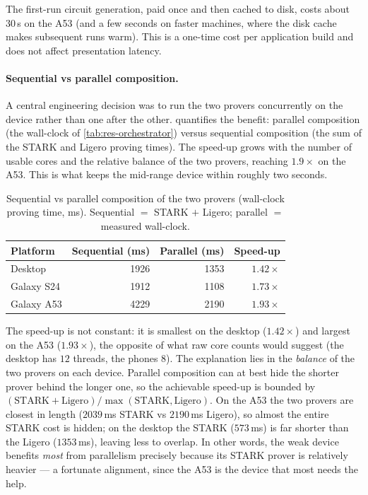 \documentclass{article}
\begin{document}
The first-run circuit generation, paid once and then cached to disk, costs about
$30$\,s on the A53 (and a few seconds on faster machines, where the disk cache
makes subsequent runs warm). This is a one-time cost per application build and
does not affect presentation latency.

\paragraph{Sequential vs parallel composition.}
A central engineering decision was to run the two provers concurrently on the
device rather than one after the other.  quantifies the
benefit: parallel composition (the wall-clock of \cref{tab:res-orchestrator})
versus sequential composition (the sum of the STARK and Ligero proving times).
The speed-up grows with the number of usable cores and the relative balance of
the two provers, reaching $1.9\times$ on the A53. This is what keeps the
mid-range device within roughly two seconds.

\begin{table}[ht]
  \centering
  \caption{Sequential vs parallel composition of the two provers (wall-clock
  proving time, ms). Sequential $=$ STARK $+$ Ligero; parallel $=$ measured
  wall-clock.}
  \label{tab:res-composition}
  \small
  \begin{tabular}{@{}lrrr@{}}
    \toprule
    \textbf{Platform} & \textbf{Sequential (ms)} & \textbf{Parallel (ms)} & \textbf{Speed-up} \\
    \midrule
    Desktop    & 1926 & 1353 & $1.42\times$ \\
    Galaxy S24 & 1912 & 1108 & $1.73\times$ \\
    Galaxy A53 & 4229 & 2190 & $1.93\times$ \\
    \bottomrule
  \end{tabular}
\end{table}

The speed-up is not constant: it is smallest on the desktop ($1.42\times$) and
largest on the A53 ($1.93\times$), the opposite of what raw core counts would
suggest (the desktop has $12$ threads, the phones $8$). The explanation lies in
the \emph{balance} of the two provers on each device. Parallel composition can at
best hide the shorter prover behind the longer one, so the achievable speed-up is
bounded by $(\text{STARK}+\text{Ligero})/\max(\text{STARK},\text{Ligero})$. On the
A53 the two provers are closest in length ($2039$\,ms STARK vs $2190$\,ms Ligero),
so almost the entire STARK cost is hidden; on the desktop the STARK ($573$\,ms) is
far shorter than the Ligero ($1353$\,ms), leaving less to overlap. In other words,
the weak device benefits \emph{most} from parallelism precisely because its STARK
prover is relatively heavier --- a fortunate alignment, since the A53 is the device
that most needs the help.
\end{document}
